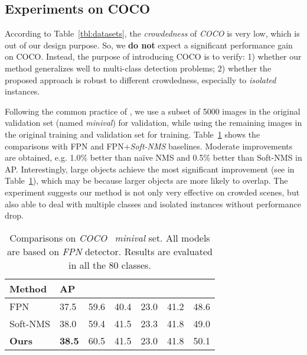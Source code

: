 \documentclass[10pt,twocolumn,letterpaper]{article}
\begin{document}
\subsection{Experiments on COCO}

According to Table~\ref{tbl:datasets}, the \emph{crowdedness} of \emph{COCO} \cite{lin2014microsoft} is very low, which is out of our design purpose. So, we \textbf{do not} expect a significant performance gain on COCO. Instead, the purpose of introducing COCO is to verify: 1) whether our method generalizes well to multi-class detection problems; 2) whether the proposed approach is robust to different crowdedness, especially to \emph{isolated} instances.  

Following the common practice of \cite{lin2017feature,lin2017focal}, we use a subset of 5000 images in the original validation set (named \emph{minival}) for validation, while using the remaining images in the original training and validation set for training. Table~\ref{tbl:mscoco_eval} shows the comparisons with FPN and FPN+\emph{Soft-NMS} baselines. Moderate improvements are obtained, e.g. 1.0\% better than na\"ive NMS and 0.5\% better than Soft-NMS in AP. Interestingly, large objects achieve the most significant improvement (see  in Table~\ref{tbl:mscoco_eval}), which may be because larger objects are more likely to overlap. The experiment suggests our method is not only very effective on crowded scenes, but also able to deal with multiple classes and isolated instances without performance drop. 

\begin{table}[t]
   \centering
   \begin{tabular}{p{15mm}|p{8mm}<{\centering}p{6mm}<{\centering}p{6mm}<{\centering}|p{6mm}<{\centering}p{6mm}<{\centering}p{6mm}<{\centering}}
   \toprule
   Method & AP &  &  &   &   & \\
   \hline
   FPN & 37.5 & 59.6 & 40.4 & 23.0 & 41.2 & 48.6 \\
   Soft-NMS & 38.0 & 59.4 & 41.5 & 23.3 & 41.8 & 49.0 \\
   \hline
   \textbf{Ours} & \textbf{38.5} & 60.5 & 41.5 & 23.0  &  41.8  & 50.1 \\

   \bottomrule
   \end{tabular}
   \caption{Comparisons on \emph{COCO}~\cite{lin2014microsoft} \emph{minival} set. All models are based on \emph{FPN} detector. Results are evaluated in all the 80 classes.  }
   \label{tbl:mscoco_eval}
\end{table}
\end{document}
